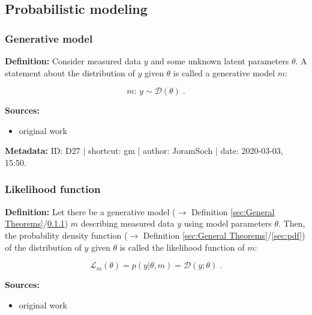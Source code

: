 \documentclass[a4paper,12pt,twoside]{book}
\begin{document}
\subsection{Probabilistic modeling}

\subsubsection[\textit{Generative model}]{Generative model} \label{sec:gm}
\setcounter{equation}{0}

\textbf{Definition:} Consider measured data $y$ and some unknown latent parameters $\theta$. A statement about the distribution of $y$ given $\theta$ is called a generative model $m$:

\begin{equation} \label{eq:gm-gm}
m: \, y \sim \mathcal{D}(\theta) \; .
\end{equation}


\vspace{1em}
\textbf{Sources:}
\begin{itemize}
\item original work\end{itemize}


\vspace{1em}
\textbf{Metadata:} ID: D27 | shortcut: gm | author: JoramSoch | date: 2020-03-03, 15:50.
\vspace{1em}



\subsubsection[\textit{Likelihood function}]{Likelihood function} \label{sec:lf}
\setcounter{equation}{0}

\textbf{Definition:} Let there be a generative model ($\rightarrow$ Definition \ref{sec:General Theorems}/\ref{sec:gm}) $m$ describing measured data $y$ using model parameters $\theta$. Then, the probability density function ($\rightarrow$ Definition \ref{sec:General Theorems}/\ref{sec:pdf}) of the distribution of $y$ given $\theta$ is called the likelihood function of $m$:

\begin{equation} \label{eq:lf-lf}
\mathcal{L}_m(\theta) = p(y|\theta,m) = \mathcal{D}(y; \theta) \; .
\end{equation}


\vspace{1em}
\textbf{Sources:}
\begin{itemize}
\item original work\end{itemize}
\end{document}
